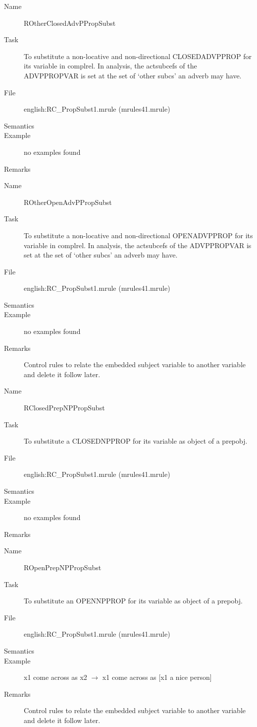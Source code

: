 \begin{description}
\vspace{1 cm}
\begin{description}
\item[Name]   ROtherClosedAdvPPropSubst
\item[Task] To substitute a non-locative and non-directional CLOSEDADVPPROP 
for its variable in 
complrel. In analysis, the actsubcefs of the ADVPPROPVAR is set at the set of 
`other subcs' an adverb may have.
\item[File] english:RC\_PropSubst1.mrule (mrules41.mrule)
\item[Semantics]
\item[Example] no examples found
\item[Remarks]
\end{description}

\vspace{1 cm}
\begin{description}
\item[Name] ROtherOpenAdvPPropSubst
\item[Task] To substitute a non-locative and non-directional OPENADVPPROP for 
its variable in 
complrel. In analysis, the actsubcefs of the ADVPPROPVAR is set at the set of 
`other subcs' an adverb may have.
\item[File] english:RC\_PropSubst1.mrule (mrules41.mrule)
\item[Semantics]
\item[Example] no examples found
\item[Remarks] Control rules to relate the embedded subject variable to 
another variable and delete it follow later.
\end{description}

\vspace{1 cm}
\begin{description}
\item[Name]   RClosedPrepNPPropSubst
\item[Task] To substitute a CLOSEDNPPROP for its variable as object of 
a prepobj. 
\item[File] english:RC\_PropSubst1.mrule (mrules41.mrule)
\item[Semantics]
\item[Example] no examples found
\item[Remarks]
\end{description}

\vspace{1 cm}
\begin{description}
\item[Name] ROpenPrepNPPropSubst
\item[Task] To substitute an OPENNPPROP for its variable as object of a 
prepobj. 
\item[File] english:RC\_PropSubst1.mrule (mrules41.mrule)
\item[Semantics]
\item[Example] x1 come across as x2 $\rightarrow$ x1 come across as [x1 a nice 
person]
\item[Remarks] Control rules to relate the embedded subject variable to 
another variable and delete it follow later.
\end{description}


\end{description}
